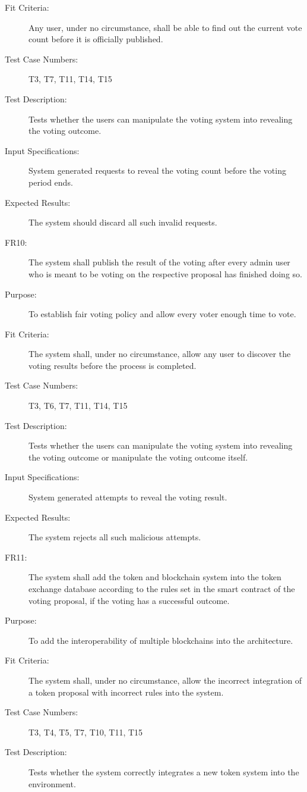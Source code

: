 \documentclass[a4paper,twoside,phd]{BYUPhys}
\begin{document}
\begin{description}
\item[Fit Criteria:] Any user, under no circumstance, shall be able to find out the current vote count before it is officially published.
\item[Test Case Numbers:] T3, T7, T11, T14, T15
\item[Test Description:] Tests whether the users can manipulate the voting system into revealing the voting outcome.
\item[Input Specifications:] System generated requests to reveal the voting count before the voting period ends.
\item[Expected Results:] The system should discard all such invalid requests.
\\
\item[FR10:] The system shall publish the result of the voting after every admin user who is meant to be voting on the respective proposal has finished doing so.
\item[Purpose:] To establish fair voting policy and allow every voter enough time to vote.
\item[Fit Criteria:] The system shall, under no circumstance, allow any user to discover the voting results before the process is completed.
\item[Test Case Numbers:] T3, T6, T7, T11, T14, T15
\item[Test Description:] Tests whether the users can manipulate the voting system into revealing the voting outcome or manipulate the voting outcome itself.
\item[Input Specifications:] System generated attempts to reveal the voting result.
\item[Expected Results:] The system rejects all such malicious attempts.
\\
\item[FR11:] The system shall add the token and blockchain system into the token exchange database according to the rules set in the smart contract of the voting proposal, if the voting has a successful outcome.
\item[Purpose:] To add the interoperability of multiple blockchains into the architecture.
\item[Fit Criteria:] The system shall, under no circumstance, allow the incorrect integration of a token proposal with incorrect rules into the system.
\item[Test Case Numbers:] T3, T4, T5, T7, T10, T11, T15
\item[Test Description:] Tests whether the system correctly integrates a new token system into the environment.

\end{description}
\end{document}
